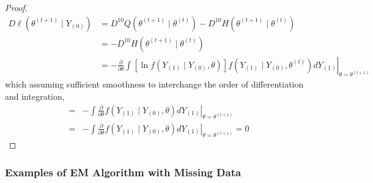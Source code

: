 \begin{proof}
    \begin{equation}
        \begin{aligned}
            D \ell\left(\theta^{(t+1)} \mid Y_{(0)}\right) & =D^{10} Q\left(\theta^{(t+1)} \mid \theta^{(t)}\right)-D^{10} H\left(\theta^{(t+1)} \mid \theta^{(t)}\right)                                                                                       \\
                                                           & =-D^{10} H\left(\theta^{(t+1)} \mid \theta^{(t)}\right)                                                                                                                                            \\
                                                           & =-\left.\frac{\partial}{\partial \theta} \int\left[\ln f\left(Y_{(1)} \mid Y_{(0)}, \theta\right)\right] f\left(Y_{(1)} \mid Y_{(0)}, \theta^{(t)}\right) d Y_{(1)}\right|_{\theta=\theta^{(t+1)}}
        \end{aligned}
    \end{equation}
    which assuming sufficient smoothness to interchange the order of differentiation and integration,
    \begin{equation}
        \begin{aligned}
            = & -\int\left.\frac{\partial}{\partial \theta} f\left(Y_{(1)} \mid Y_{(0)}, \theta\right) d Y_{(1)}\right|_{\theta=\theta^{(t+1)}}    \\
            = & -\left.\int \frac{\partial}{\partial \theta} f\left(Y_{(1)} \mid Y_{(0)}, \theta\right) d Y_{(1)}\right|_{\theta=\theta^{(t+1)}}=0
        \end{aligned}
    \end{equation}
\end{proof}

\subsubsection{Examples of EM Algorithm with Missing Data}


